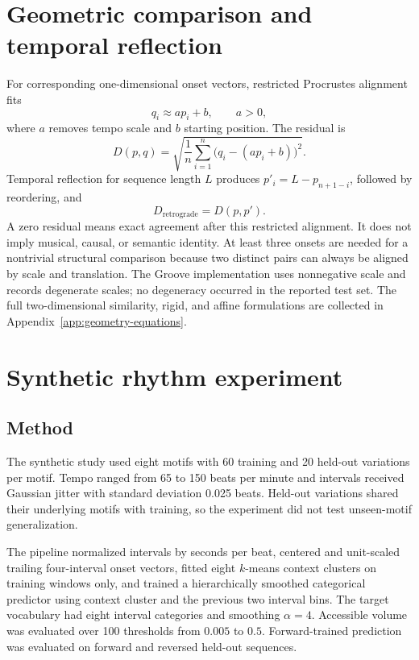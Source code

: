 \section{Geometric comparison and temporal reflection}
For corresponding one-dimensional onset vectors, restricted Procrustes alignment fits
\begin{equation}
q_i\approx ap_i+b,\qquad a>0,
\end{equation}
where $a$ removes tempo scale and $b$ starting position. The residual is
\begin{equation}
D(p,q)=\sqrt{\frac1n\sum_{i=1}^{n}\bigl(q_i-(ap_i+b)\bigr)^2}.
\label{eq:procrustes-1d}
\end{equation}
Temporal reflection for sequence length $L$ produces $p'_i=L-p_{n+1-i}$, followed by reordering, and
\begin{equation}
D_{\mathrm{retrograde}}=D(p,p').
\end{equation}
A zero residual means exact agreement after this restricted alignment. It does not imply musical, causal, or semantic identity. At least three onsets are needed for a nontrivial structural comparison because two distinct pairs can always be aligned by scale and translation. The Groove implementation uses nonnegative scale and records degenerate scales; no degeneracy occurred in the reported test set. The full two-dimensional similarity, rigid, and affine formulations are collected in Appendix~\ref{app:geometry-equations}.

\section{Synthetic rhythm experiment}
\subsection{Method}
The synthetic study used eight motifs with 60 training and 20 held-out variations per motif. Tempo ranged from 65 to 150 beats per minute and intervals received Gaussian jitter with standard deviation 0.025 beats. Held-out variations shared their underlying motifs with training, so the experiment did not test unseen-motif generalization.

The pipeline normalized intervals by seconds per beat, centered and unit-scaled trailing four-interval onset vectors, fitted eight $k$-means context clusters on training windows only, and trained a hierarchically smoothed categorical predictor using context cluster and the previous two interval bins. The target vocabulary had eight interval categories and smoothing $\alpha=4$. Accessible volume was evaluated over 100 thresholds from $0.005$ to $0.5$. Forward-trained prediction was evaluated on forward and reversed held-out sequences.

